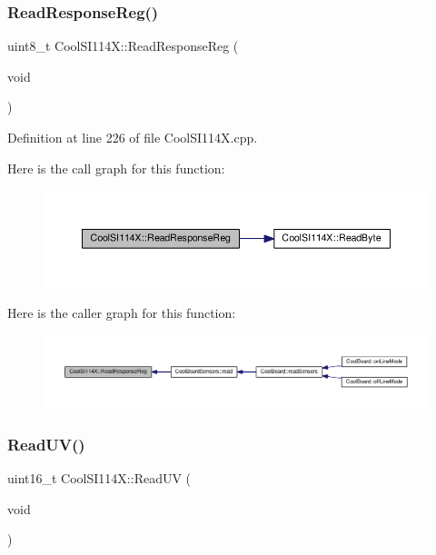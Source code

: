 \subsubsection{\texorpdfstring{Read\+Response\+Reg()}{ReadResponseReg()}}
{\footnotesize\ttfamily uint8\+\_\+t Cool\+S\+I114\+X\+::\+Read\+Response\+Reg (\begin{DoxyParamCaption}\item[{void}]{ }\end{DoxyParamCaption})}



Definition at line 226 of file Cool\+S\+I114\+X.\+cpp.

Here is the call graph for this function\+:
\nopagebreak
\begin{figure}[H]
\begin{center}
\leavevmode
\includegraphics[width=350pt]{class_cool_s_i114_x_a869d3825147831d707f7ef324a665646_cgraph}
\end{center}
\end{figure}
Here is the caller graph for this function\+:
\nopagebreak
\begin{figure}[H]
\begin{center}
\leavevmode
\includegraphics[width=350pt]{class_cool_s_i114_x_a869d3825147831d707f7ef324a665646_icgraph}
\end{center}
\end{figure}
\mbox{\label{class_cool_s_i114_x_a14ced664d74e93438440b0274109c111}} 
\subsubsection{\texorpdfstring{Read\+U\+V()}{ReadUV()}}
{\footnotesize\ttfamily uint16\+\_\+t Cool\+S\+I114\+X\+::\+Read\+UV (\begin{DoxyParamCaption}\item[{void}]{ }\end{DoxyParamCaption})}



